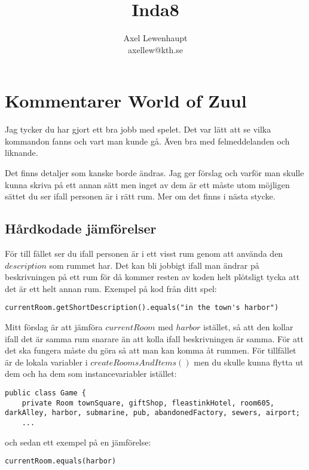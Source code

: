 \documentclass[a4paper,11pt]{article}
\title{Inda8}
\author{Axel Lewenhaupt\\axellew@kth.se}
\begin{document}
\section{Kommentarer World of Zuul}
Jag tycker du har gjort ett bra jobb med spelet. Det var lätt att se vilka kommandon fanns och vart man kunde gå. Även bra med felmeddelanden och liknande.

Det finns detaljer som kanske borde ändras. Jag ger förslag och varför man skulle kunna skriva på ett annan sätt men inget av dem är ett måste utom möjligen sättet du ser ifall personen är i rätt rum. Mer om det finns i nästa stycke.

\subsection{Hårdkodade jämförelser}
För till fället ser du ifall personen är i ett visst rum genom att använda den $description$ som rummet har. Det kan bli jobbigt ifall man ändrar på beskrivningen på ett rum för då kommer resten av koden helt plötsligt tycka att det är ett helt annan rum. Exempel på kod från ditt spel:
\begin{lstlisting}
currentRoom.getShortDescription().equals("in the town's harbor")
\end{lstlisting}
Mitt förslag är att jämföra $currentRoom$ med $harbor$ istället, så att den kollar ifall det är samma rum snarare än att kolla ifall beskrivningen är samma. För att det ska fungera måste du göra så att man kan komma åt rummen. För tillfället är de lokala variabler i $createRoomsAndItems()$ men du skulle kunna flytta ut dem och ha dem som instancevariabler istället:
\begin{lstlisting}
public class Game {
    private Room townSquare, giftShop, fleastinkHotel, room605, darkAlley, harbor, submarine, pub, abandonedFactory, sewers, airport;
    ...
\end{lstlisting}
och sedan ett exempel på en jämförelse:
\begin{lstlisting}
currentRoom.equals(harbor)
\end{lstlisting}
\end{document}
